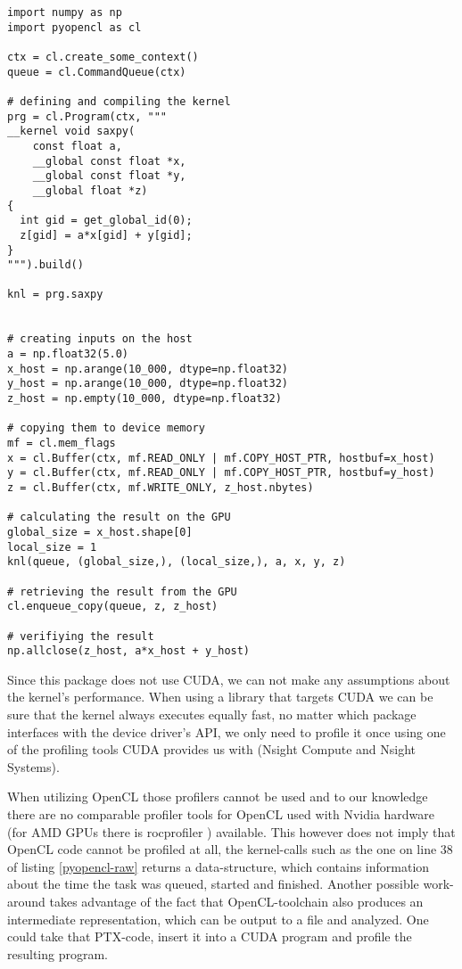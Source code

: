 \documentclass[english,11pt,a4paper,table]{article} %
\begin{document}
\begin{verbatim}
import numpy as np
import pyopencl as cl

ctx = cl.create_some_context()
queue = cl.CommandQueue(ctx)

# defining and compiling the kernel
prg = cl.Program(ctx, """
__kernel void saxpy(
    const float a,
	__global const float *x,
	__global const float *y,
	__global float *z)
{
  int gid = get_global_id(0);
  z[gid] = a*x[gid] + y[gid];
}
""").build()

knl = prg.saxpy


# creating inputs on the host
a = np.float32(5.0)
x_host = np.arange(10_000, dtype=np.float32)
y_host = np.arange(10_000, dtype=np.float32)
z_host = np.empty(10_000, dtype=np.float32)

# copying them to device memory
mf = cl.mem_flags
x = cl.Buffer(ctx, mf.READ_ONLY | mf.COPY_HOST_PTR, hostbuf=x_host)
y = cl.Buffer(ctx, mf.READ_ONLY | mf.COPY_HOST_PTR, hostbuf=y_host)
z = cl.Buffer(ctx, mf.WRITE_ONLY, z_host.nbytes)

# calculating the result on the GPU
global_size = x_host.shape[0]
local_size = 1
knl(queue, (global_size,), (local_size,), a, x, y, z)

# retrieving the result from the GPU
cl.enqueue_copy(queue, z, z_host)

# verifiying the result
np.allclose(z_host, a*x_host + y_host)
\end{verbatim}

Since this package does not use CUDA, we can not make any assumptions about the kernel's performance.
When using a library that targets CUDA we can be sure that the kernel always executes equally fast, no matter which package interfaces with the device driver's API, we only need to profile it once using one of the profiling tools CUDA provides us with (Nsight Compute and Nsight Systems).

When utilizing OpenCL those profilers cannot be used and to our knowledge there are no comparable profiler tools for OpenCL used with Nvidia hardware (for AMD GPUs there is rocprofiler \cite{GitHubRO33:online}) available.
This however does not imply that OpenCL code cannot be profiled at all, the kernel-calls such as the one on line 38 of listing \ref{pyopencl-raw} returns a data-structure, which contains information about the time the task was queued, started and finished.
Another possible work-around takes advantage of the fact that OpenCL-toolchain also produces an intermediate representation, which can be output to a file and analyzed.
One could take that PTX-code, insert it into a CUDA program and profile the resulting program.
\end{document}
